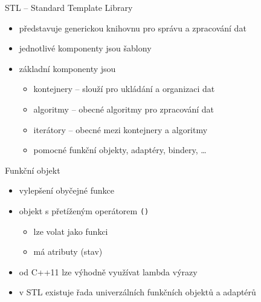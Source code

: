 
\begin{frame}[fragile]
\begin{block}{STL -- Standard Template Library}
\begin{itemize}
\item představuje generickou knihovnu pro správu a zpracování dat
\item jednotlivé komponenty jsou šablony
\item základní komponenty jsou
\begin{itemize}
\item kontejnery -- slouží pro ukládání a organizaci dat
\item algoritmy -- obecné algoritmy pro zpracování dat
\item iterátory -- obecné  mezi kontejnery a algoritmy
\item pomocné funkční objekty, adaptéry, bindery, \ldots
\end{itemize}
\end{itemize}
\end{block}


\begin{block}{Funkční objekt}
\begin{itemize}
\item vylepšení obyčejné funkce
\item objekt s přetíženým operátorem \lstinline|()|
\begin{itemize}
\item lze volat jako funkci
\item má atributy (stav)
\end{itemize}
\item od C++11 lze výhodně využívat lambda výrazy
\item v STL existuje řada univerzálních funkčních objektů a adaptérů
\end{itemize}
\end{block}
\end{frame}





